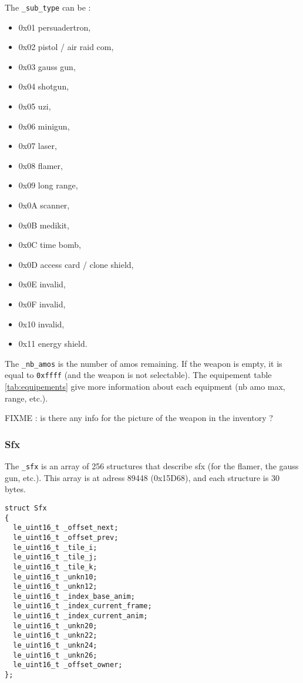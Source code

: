 \documentclass[a4paper,twoside,12pt,dvips]{article}
\begin{document}
The \texttt{\_sub\_type} can be :
\begin{itemize}
\item 0x01 persuadertron,
\item 0x02 pistol / air raid com,
\item 0x03 gauss gun,
\item 0x04 shotgun,
\item 0x05 uzi,
\item 0x06 minigun,
\item 0x07 laser,
\item 0x08 flamer,
\item 0x09 long range,
\item 0x0A scanner,
\item 0x0B medikit,
\item 0x0C time bomb,
\item 0x0D access card / clone shield,
\item 0x0E invalid,
\item 0x0F invalid,
\item 0x10 invalid,
\item 0x11 energy shield.
\end{itemize}

The \texttt{\_nb\_amos} is the number of amos remaining. If the weapon is empty, it is equal to \texttt{0xffff} (and the weapon is not selectable). The equipement table \ref{tab:equipements} give more information about each equipment (nb amo max, range, etc.).

FIXME : is there any info for the picture of the weapon in the inventory ?

\subsubsection{Sfx}
\label{sec:sfx}

The \texttt{\_sfx} is an array of 256 structures that describe sfx (for the flamer, the gauss gun, etc.). This array is at adress 89448 (0x15D68), and each structure is 30 bytes.

\begin{lstlisting}
struct Sfx
{
  le_uint16_t _offset_next;
  le_uint16_t _offset_prev;
  le_uint16_t _tile_i;
  le_uint16_t _tile_j;
  le_uint16_t _tile_k;
  le_uint16_t _unkn10;
  le_uint16_t _unkn12;
  le_uint16_t _index_base_anim;
  le_uint16_t _index_current_frame;
  le_uint16_t _index_current_anim;
  le_uint16_t _unkn20;
  le_uint16_t _unkn22;
  le_uint16_t _unkn24;
  le_uint16_t _unkn26;
  le_uint16_t _offset_owner;
};
\end{lstlisting}
\end{document}
